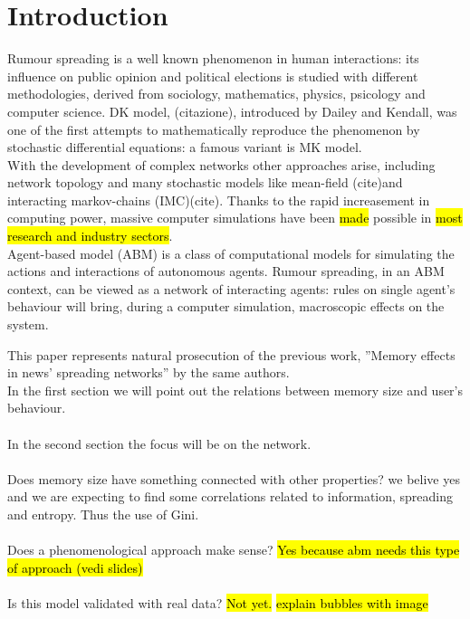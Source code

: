 \section{Introduction}
Rumour spreading is a well known phenomenon in human interactions:
its influence on public opinion and political elections is studied
with different methodologies, derived from sociology, mathematics,
physics, psicology and computer science.
DK model, (citazione), introduced by Dailey and Kendall, was one of
the first attempts to mathematically reproduce the phenomenon by
stochastic differential equations: a famous variant is MK model.\\
With the development of complex networks other approaches arise,
including network topology and many stochastic models
like mean-field (cite)and interacting markov-chains (IMC)(cite).
Thanks to the rapid increasement in computing power,
massive computer simulations have been \hl{made} possible in
\hl{most research and industry sectors}.\\
Agent-based model (ABM) is a class of computational models for
simulating the actions and interactions of autonomous agents.
Rumour spreading, in an ABM context, can be viewed as a network
of interacting agents: rules on single agent's behaviour
will bring, during a computer simulation, macroscopic
effects on the system.



This paper represents natural prosecution of the previous work,
''Memory effects in news' spreading networks'' by the same authors.\\



In the first section we will point out the relations between memory size
and user's behaviour. \\ \\
In the second section the focus will be on the network.\\ \\
Does memory size have something connected with other properties?
we belive yes and we are expecting to find some correlations related
to information, spreading and entropy. Thus the use of Gini.\\ \\
Does a phenomenological approach make sense? \hl{Yes because abm needs
this type of approach (vedi slides)}\\ \\
Is this model validated with real data? \hl{Not yet.}
\hl{explain bubbles with image}